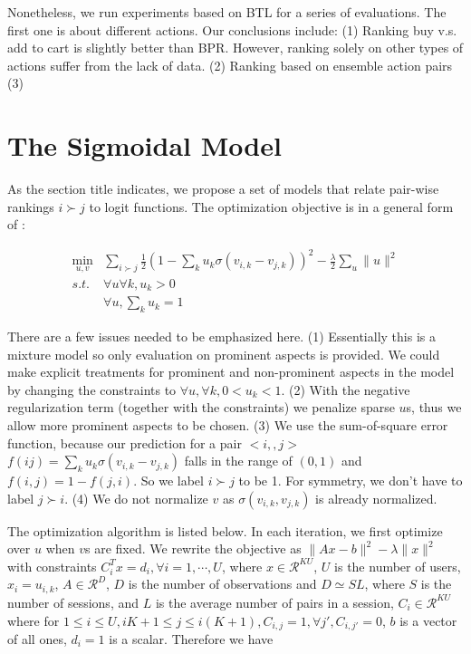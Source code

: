 \documentclass[11pt]{report}
\newcommand{\Real}{\mathcal{R}}
\begin{document}
Nonetheless, we run experiments based on BTL for a series of evaluations. The first one is about different actions. Our conclusions include: (1) Ranking buy v.s. add to cart is slightly better than BPR. However,  ranking solely on other types of actions suffer from the lack of data. (2) Ranking based on ensemble action pairs (3) 

 
\section{The Sigmoidal Model}
As the section title indicates, we propose a set of models that relate pair-wise rankings $i\succ j$ to logit functions. The optimization objective is in a general form of :

\begin{eqnarray}
\min_{u,v} & \sum_{i\succ j} \frac{1}{2} (1-\sum_k u_k \sigma(v_{i,k}-v_{j,k}))^2 - \frac{\lambda}{2} \sum_u \|u\|^2 \\\nonumber
 s.t. & \forall u \forall k, u_k>0\\\nonumber
  & \forall u, \sum_k u_k=1
\end{eqnarray}

There are a few issues needed to be emphasized here. (1) Essentially this is a mixture model so only evaluation on prominent aspects is provided. We could make explicit treatments for prominent and non-prominent aspects in the model by changing the constraints to $\forall u,\forall k, 0<u_k<1$. (2) With the negative regularization term (together with the constraints) we penalize sparse $u$s, thus we allow more prominent aspects to be chosen. (3) We use the sum-of-square error function, because our prediction for a pair $<i,,j>$$f(i j)=\sum_k u_k \sigma(v_{i,k}-v_{j,k})$ falls in the range of $(0,1)$ and $f(i,j)=1-f(j,i)$. So we label $i\succ j$ to be 1. For symmetry, we don't have to label $j\succ i$. (4) We do not normalize $v$ as $\sigma(v_{i,k}, v_{j,k})$ is already normalized.

The optimization algorithm is listed below. In each iteration, we first optimize over $u$ when $v$s are fixed. We rewrite the objective as $\|Ax-b\|^2-\lambda \|x\|^2$ with constraints $C_i^Tx=d_i, \forall i=1,\cdots,U$, where $x\in \Real^{KU}$, $U$ is the number of users, $x_i=u_{i,k}$, $A\in \Real^{D}$, $D$ is the number of observations and $D\simeq SL$, where $S$ is the number of sessions, and $L$ is the average number of pairs in a session, $C_i\in \Real^{KU}$ where for $1\leq i \leq U, iK+1\leq j \leq i(K+1), C_{i,j}=1, \forall j', C_{i,j'}=0$, $b$ is a vector of all ones, $d_i=1$ is a scalar. Therefore we have
\end{document}
